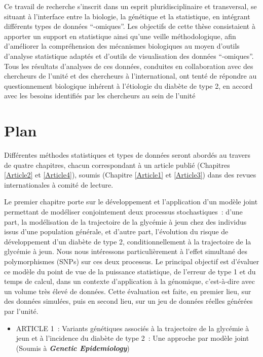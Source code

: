 \documentclass[11pt,a4paper,notrimn]{krantz}
\providecommand{\tightlist}{%
  \setlength{\itemsep}{0pt}\setlength{\parskip}{0pt}}
\theoremstyle{definition}
\theoremstyle{definition}
\theoremstyle{remark}
\begin{document}
Ce travail de recherche s'inscrit dans un esprit pluridisciplinaire et
transversal, se situant à l'interface entre la biologie, la génétique et
la statistique, en intégrant différents types de données ``-omiques''.
Les objectifs de cette thèse consistaient à apporter un support en
statistique ainsi qu'une veille méthodologique, afin d'améliorer la
compréhension des mécanismes biologiques au moyen d'outils d'analyse
statistique adaptés et d'outils de visualisation des données
``-omiques''. Tous les résultats d'analyses de ces données, conduites en
collaboration avec des chercheurs de l'unité et des chercheurs à
l'international, ont tenté de répondre au questionnement biologique
inhérent à l'étiologie du diabète de type 2, en accord avec les besoins
identifiés par les chercheurs au sein de l'unité

\section*{Plan}\label{plan}


Différentes méthodes statistiques et types de données seront abordés au
travers de quatre chapitres, chacun correspondant à un article publié
(Chapitres \ref{Article2} et \ref{Article4}), soumis (Chapitre
\ref{Article1} et \ref{Article3}) dans des revues internationales à
comité de lecture.

Le premier chapitre porte sur le développement et l'application d'un
modèle joint permettant de modéliser conjointement deux processus
stochastiques~: d'une part, la modélisation de la trajectoire de la
glycémie à jeun chez des individus issus d'une population générale, et
d'autre part, l'évolution du risque de développement d'un diabète de
type 2, conditionnellement à la trajectoire de la glycémie à jeun. Nous
nous intéressons particulièrement à l'effet simultané des polymorphismes
(SNPs) sur ces deux processus. Le principal objectif est d'évaluer ce
modèle du point de vue de la puissance statistique, de l'erreur de type
1 et du temps de calcul, dans un contexte d'application à la génomique,
c'est-à-dire avec un volume très élevé de données. Cette évaluation est
faite, en premier lieu, sur des données simulées, puis en second lieu,
sur un jeu de données réelles générées par l'unité.

\begin{itemize}
\tightlist
\item
  ARTICLE 1~: Variants génétiques associés à la trajectoire de la
  glycémie à jeun et à l'incidence du diabète de type 2~: Une approche
  par modèle joint (Soumis à \textbf{\emph{Genetic Epidemiology}})
\end{itemize}
\end{document}
